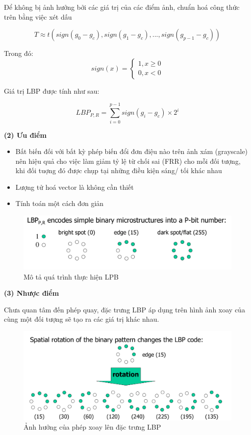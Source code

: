 \documentclass{article}
\begin{document}
	Để không bị ảnh hưởng bởi các giá trị của các điểm ảnh, chuẩn hoá công thức trên bằng việc xét dấu
	
	\begin{equation}
		T \approx t(sign(g_0 - g_c), sign(g_1 - g_c), ..., sign(g_{p-1} - g_c))
	\end{equation}
		
	Trong đó:
	$$sign(x) = \begin{cases}1, x \geq 0\\ 0, x < 0\end{cases}$$
	
	Giá trị LBP được tính như sau:
	
	\begin{equation}
		LBP_{P, R} = \sum_{i=0}^{p-1} sign(g_i-g_c) \times 2^i
	\end{equation}

	\textbf{(2) Ưu điểm}\newline
	\begin{itemize}
		\item Bất biến đối với bất kỳ phép biến đổi đơn điệu nào trên ảnh xám (grayscale) nên hiệu quả cho việc làm giảm tỷ lệ từ chối sai (FRR) cho mỗi đối tượng, khi đối tuợng đó được chụp tại những điều kiện sáng/ tối khác nhau
		\item Lượng tử hoá vector là không cần thiết
		\item Tính toán một cách đơn giản
	\end{itemize}

	\begin{figure}[H]
		\centering
		\includegraphics[width=0.75\linewidth]{images/lbp_pr.png}
		\caption{Mô tả quá trình thực hiện LPB}
		\label{fig:writing-thesis}
	\end{figure}

	\textbf{(3) Nhược điểm}\newline
	
	Chưa quan tâm đến phép quay, đặc trưng LBP áp dụng trên hình ảnh xoay của cùng một đối tượng sẽ tạo ra các giá trị khác nhau.
	
	\begin{figure}[H]
		\centering
		\includegraphics[width=0.75\linewidth]{images/stuck_lbp_pr.png}
		\caption{Ảnh hưởng của phép xoay lên đặc trưng LBP}
		\label{fig:writing-thesis}
	\end{figure}
	
\end{document}
